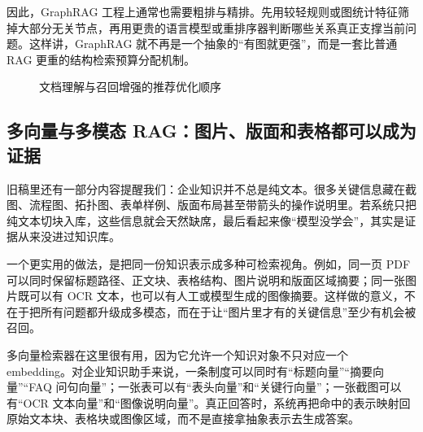 因此，GraphRAG 工程上通常也需要粗排与精排。先用较轻规则或图统计特征筛掉大部分无关节点，再用更贵的语言模型或重排序器判断哪些关系真正支撑当前问题。这样讲，GraphRAG 就不再是一个抽象的“有图就更强”，而是一套比普通 RAG 更重的结构检索预算分配机制。

\begin{figure}[H]
\centering
{}
\caption{文档理解与召回增强的推荐优化顺序}
\label{fig:rag-optimization-stack}
\end{figure}

\subsection{多向量与多模态 RAG：图片、版面和表格都可以成为证据}
旧稿里还有一部分内容提醒我们：企业知识并不总是纯文本。很多关键信息藏在截图、流程图、拓扑图、表单样例、版面布局甚至带箭头的操作说明里。若系统只把纯文本切块入库，这些信息就会天然缺席，最后看起来像“模型没学会”，其实是证据从来没进过知识库。

一个更实用的做法，是把同一份知识表示成多种可检索视角。例如，同一页 PDF 可以同时保留标题路径、正文块、表格结构、图片说明和版面区域摘要；同一张图片既可以有 OCR 文本，也可以有人工或模型生成的图像摘要。这样做的意义，不在于把所有问题都升级成多模态，而在于让“图片里才有的关键信息”至少有机会被召回。

多向量检索器在这里很有用，因为它允许一个知识对象不只对应一个 embedding。对企业知识助手来说，一条制度可以同时有“标题向量”“摘要向量”“FAQ 问句向量”；一张表可以有“表头向量”和“关键行向量”；一张截图可以有“OCR 文本向量”和“图像说明向量”。真正回答时，系统再把命中的表示映射回原始文本块、表格块或图像区域，而不是直接拿抽象表示去生成答案。

